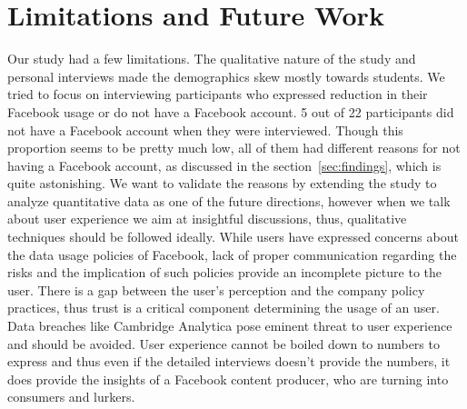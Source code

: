 \section{Limitations and Future Work}
\label{sec:limitations}
Our study had a few limitations. The qualitative nature of the study and personal interviews made the demographics skew mostly towards students. We tried to focus on interviewing participants who expressed reduction in their Facebook usage or do not have a Facebook account. 5 out of 22 participants did not have a Facebook account when they were interviewed. Though this proportion seems to be pretty much low, all of them had different reasons for not having a Facebook account, as discussed in the section~\ref{sec:findings}, which is quite astonishing. We want to validate the reasons by extending the study to analyze quantitative data as one of the future directions, however when we talk about user experience we aim at insightful discussions, thus, qualitative techniques should be followed ideally. While users have expressed concerns about the data usage policies of Facebook, lack of proper communication regarding the risks and the implication of such policies provide an incomplete picture to the user. There is a gap between the user's perception and the company policy practices, thus trust is a critical component determining the usage of an user. Data breaches like Cambridge Analytica pose eminent threat to user experience and should be avoided. User experience cannot be boiled down to numbers to express and thus even if the detailed interviews doesn't provide the numbers, it does provide the insights of a Facebook content producer, who are turning into consumers and lurkers. 